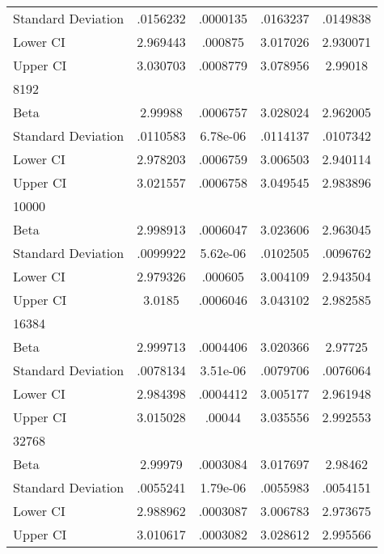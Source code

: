 {\begin{tabular}{l*{1}{cccc}}
Standard Deviation  &    .0156232&    .0000135&    .0163237&    .0149838\\
Lower CI            &    2.969443&     .000875&    3.017026&    2.930071\\
Upper CI            &    3.030703&    .0008779&    3.078956&     2.99018\\
\hline
8192                &            &            &            &            \\
Beta                &     2.99988&    .0006757&    3.028024&    2.962005\\
Standard Deviation  &    .0110583&    6.78e-06&    .0114137&    .0107342\\
Lower CI            &    2.978203&    .0006759&    3.006503&    2.940114\\
Upper CI            &    3.021557&    .0006758&    3.049545&    2.983896\\
\hline
10000               &            &            &            &            \\
Beta                &    2.998913&    .0006047&    3.023606&    2.963045\\
Standard Deviation  &    .0099922&    5.62e-06&    .0102505&    .0096762\\
Lower CI            &    2.979326&     .000605&    3.004109&    2.943504\\
Upper CI            &      3.0185&    .0006046&    3.043102&    2.982585\\
\hline
16384               &            &            &            &            \\
Beta                &    2.999713&    .0004406&    3.020366&     2.97725\\
Standard Deviation  &    .0078134&    3.51e-06&    .0079706&    .0076064\\
Lower CI            &    2.984398&    .0004412&    3.005177&    2.961948\\
Upper CI            &    3.015028&      .00044&    3.035556&    2.992553\\
\hline
32768               &            &            &            &            \\
Beta                &     2.99979&    .0003084&    3.017697&     2.98462\\
Standard Deviation  &    .0055241&    1.79e-06&    .0055983&    .0054151\\
Lower CI            &    2.988962&    .0003087&    3.006783&    2.973675\\
Upper CI            &    3.010617&    .0003082&    3.028612&    2.995566\\

\end{tabular}}
